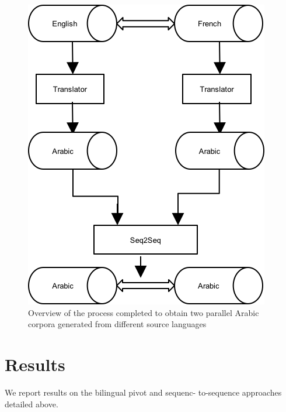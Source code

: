 \documentclass[11pt,letterpaper]{article}
\begin{document}
\begin{figure}
\includegraphics[scale=1.0]{monolingual}
\caption{Overview of the process completed to obtain two parallel Arabic corpora generated from different source languages}
\label{fig:mono}
\end{figure}
\section{Results}
\label{earlyresults}
We report results on the bilingual pivot and sequenc- to-sequence approaches detailed above. 
\end{document}
